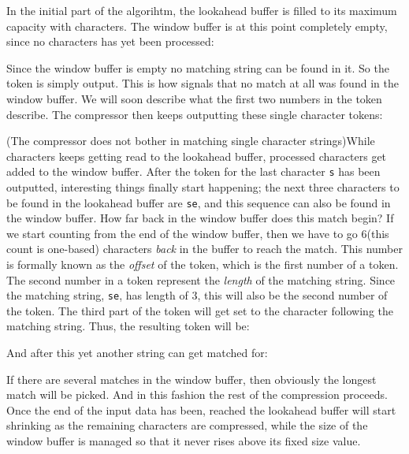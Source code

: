 In the initial part of the algorihtm, the lookahead buffer is filled
to its maximum capacity with characters. The window buffer is at this
point completely empty, since no characters has yet been processed:

\newcommand{\windowsize}{20}
\newcommand{\lookaheadsize}{10}


Since the window buffer is empty no matching string can be found in
it. So the token  is simply output. This is how \lzone
signals that no match at all was found in the window buffer. We will
soon describe what the first two numbers in the token describe. The
compressor then keeps outputting these single character tokens:


(The \lzone compressor does not bother in matching single character
strings)While characters keeps getting read to the lookahead buffer,
processed characters get added to the window buffer. After the token
for the last character \texttt{s} has been outputted, interesting
things finally start happening; the next three characters to be found
in the lookahead buffer are \texttt{{\spc{}se}}, and this sequence can
also be found in the window buffer. How far back in the window buffer
does this match begin? If we start counting from the end of the window
buffer, then we have to go $6$(this count is one-based) characters
\textit{back} in the buffer to reach the match. This number is formally known
as the \textit{offset} of the token, which is the first number of a
token. The second number in a token represent the \textit{length} of
the matching string. Since the matching string, \texttt{{\spc{}se}},
has length of $3$, this will also be the second number of the
token. The third part of the token will get set to the character
following the matching string. Thus, the resulting token will be:


And after this yet another string can get matched for:


If there are several matches in the window buffer, then obviously the
longest match will be picked. And in this fashion the rest of the
compression proceeds. Once the end of the input data has been, reached
the lookahead buffer will start shrinking as the remaining characters
are compressed, while the size of the window buffer is managed so that
it never rises above its fixed size value.

